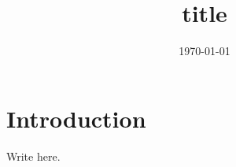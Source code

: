 \documentclass{article}
\title{{{title}}}
\author{}
\date{\today}
\begin{document}
\maketitle

\section{Introduction}

Write here.
\end{document}
